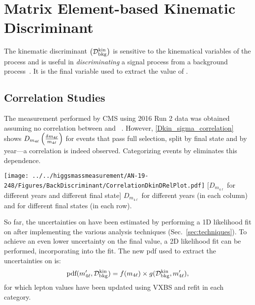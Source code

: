 \section{Matrix Element-based Kinematic Discriminant}
\label{sec:Dkin}
The kinematic discriminant $\left( \mathcal{D}^{\text{kin}}_{\text{bkg}} \right)$ is sensitive to the kinematical variables of the \qqggzzfourl process and is useful in \emph{discriminating} a signal process from a background process~\cite{HIG_19_001}.
It is the final variable used to extract the value of \mH.

\subsection{Correlation Studies}
\label{sec:DkinCorrelation}
The \mH measurement performed by CMS using 2016 Run 2 data was obtained assuming no correlation between \relmfourlerrflat and \Dkinbkg~\cite{HIG_16_041}.
However, \cref{Dkin_sigma_correlation} shows $D_{m_{4\ell}} \left( \frac{\delta m_{4\ell}}{m_{4\ell}} \right)$ \vs \Dkinbkg for events that pass full selection, split by final state and by year---a correlation is indeed observed.
Categorizing events by \relmfourlerrflat eliminates this dependence.
\begin{multiFigure}
	\centering
		\texttt{[image: ../../higgsmassmeasurement/AN-19-248/Figures/BackDiscriminant/CorrelationDkinDRelPlot.pdf]}
		[$D_{m_{4\ell}}$ \vs \Dkinbkg for different years and different final state]
		{$D_{m_{4\ell}}$ \vs \Dkinbkg for different years (in each column) and for different final states (in each row).}
	\label{Dkin_sigma_correlation}
\end{multiFigure}

So far, the uncertainties on \mH have been estimated by performing a 1D likelihood fit on \mfourl after implementing the various analysis techniques (Sec.~\ref{sec:techniques}).
To achieve an even lower uncertainty on the final \mH value, a 2D likelihood fit can be performed, incorporating \Dkinbkg into the fit.
The new pdf used to extract the uncertainties on \mH is:
\[
\text{pdf}(m'_{4\ell}, \mathcal{D}^{\text{kin}}_{\text{bkg}}) = f(m_{4\ell}) \times g(\mathcal{D}^{\text{kin}}_{\text{bkg}}, m'_{4\ell}),
\]
for which lepton \pt values have been updated using VXBS and \Zone refit in each category.

